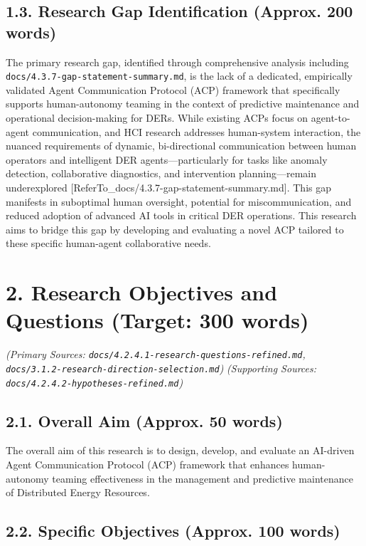 \documentclass[12pt,a4paper]{article}
\begin{document}
\subsection{1.3. Research Gap Identification (Approx. 200 words)}
The primary research gap, identified through comprehensive analysis including \texttt{docs/4.3.7-gap-statement-summary.md}, is the lack of a dedicated, empirically validated Agent Communication Protocol (ACP) framework that specifically supports human-autonomy teaming in the context of predictive maintenance and operational decision-making for DERs. While existing ACPs focus on agent-to-agent communication, and HCI research addresses human-system interaction, the nuanced requirements of dynamic, bi-directional communication between human operators and intelligent DER agents—particularly for tasks like anomaly detection, collaborative diagnostics, and intervention planning—remain underexplored [ReferTo_docs/4.3.7-gap-statement-summary.md]. This gap manifests in suboptimal human oversight, potential for miscommunication, and reduced adoption of advanced AI tools in critical DER operations. This research aims to bridge this gap by developing and evaluating a novel ACP tailored to these specific human-agent collaborative needs.

\section{2. Research Objectives and Questions (Target: 300 words)}

\emph{(Primary Sources: \texttt{docs/4.2.4.1-research-questions-refined.md}, \texttt{docs/3.1.2-research-direction-selection.md})}
\emph{(Supporting Sources: \texttt{docs/4.2.4.2-hypotheses-refined.md})}

\subsection{2.1. Overall Aim (Approx. 50 words)}
The overall aim of this research is to design, develop, and evaluate an AI-driven Agent Communication Protocol (ACP) framework that enhances human-autonomy teaming effectiveness in the management and predictive maintenance of Distributed Energy Resources.

\subsection{2.2. Specific Objectives (Approx. 100 words)}
\end{document}
